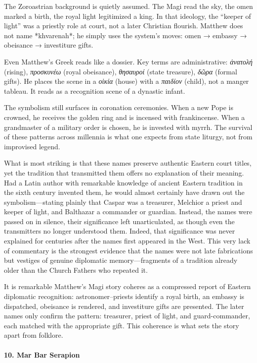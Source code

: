 The Zoroastrian background is quietly assumed.
The Magi read the sky, the omen marked a birth, the royal light legitimized a king.
In that ideology, the “keeper of light” was a priestly role at court, not a later Christian flourish.
Matthew does not name *khvarenah*; he simply uses the system’s moves: omen → embassy → obeisance → investiture gifts.

Even Matthew’s Greek reads like a dossier.
Key terms are administrative: \textit{ἀνατολή} (rising), \textit{προσκυνέω} (royal obeisance), \textit{θησαυροί} (state treasure), \textit{δῶρα} (formal gifts).
He places the scene in a \textit{οἰκία} (house) with a \textit{παιδίον} (child), not a manger tableau.
It reads as a recognition scene of a dynastic infant.

The symbolism still surfaces in coronation ceremonies.
When a new Pope is crowned, he receives the golden ring and is incensed with frankincense.
When a grandmaster of a military order is chosen, he is invested with myrrh.
The survival of these patterns across millennia is what one expects from state liturgy, not from improvised legend.

What is most striking is that these names preserve authentic Eastern court titles, yet the tradition that transmitted them offers no explanation of their meaning.
Had a Latin author with remarkable knowledge of ancient Eastern tradition in the sixth century invented them, he would almost certainly have drawn out the symbolism—stating plainly that Caspar was a treasurer, Melchior a priest and keeper of light, and Balthazar a commander or guardian.
Instead, the names were passed on in silence, their significance left unarticulated, as though even the transmitters no longer understood them.
Indeed, that significance was never explained for centuries after the names first appeared in the West.
This very lack of commentary is the strongest evidence that the names were not late fabrications but vestiges of genuine diplomatic memory—fragments of a tradition already older than the Church Fathers who repeated it.

It is remarkable Matthew’s Magi story coheres as a compressed report of Eastern diplomatic recognition: astronomer–priests identify a royal birth, an embassy is dispatched, obeisance is rendered, and investiture gifts are presented.
The later names only confirm the pattern: treasurer, priest of light, and guard-commander, each matched with the appropriate gift.
This coherence is what sets the story apart from folklore.

\paragraph{10.
Mar Bar Serapion}\label{par:mar-bar-serapion}

